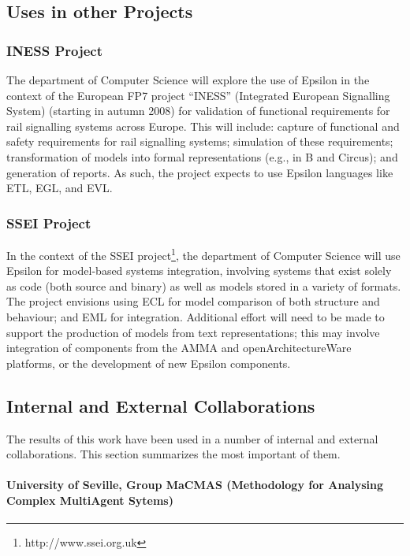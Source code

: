 \subsection{Uses in other Projects}

\subsubsection{INESS Project}
The department of Computer Science will explore the use of Epsilon in the context of the European FP7 project ``INESS'' (Integrated European Signalling System) (starting in autumn 2008) for validation of functional requirements for rail signalling systems across Europe. This will include: capture of functional and safety requirements for rail signalling systems; simulation of these requirements; transformation of models into formal representations (e.g., in B and Circus); and generation of reports. As such, the project expects to use Epsilon languages like ETL, EGL, and EVL.

\subsubsection{SSEI Project}

In the context of the SSEI project\footnote{http://www.ssei.org.uk}, the department of Computer Science will use Epsilon for model-based systems integration, involving systems that exist solely as code (both source and binary) as well as models stored in a variety of formats. The project envisions using ECL for model comparison of both structure and behaviour; and EML for integration. Additional effort will need to be made to support the production of models from text representations; this may involve integration of components from the AMMA and openArchitectureWare platforms, or the development of new Epsilon components. 

\subsection{Internal and External Collaborations}
\label{sec:Collaborations}

The results of this work have been used in a number of internal and external collaborations. This section summarizes the most important of them.

\paragraph{University of Seville,  Group MaCMAS (Methodology for Analysing Complex MultiAgent Sytems)}

